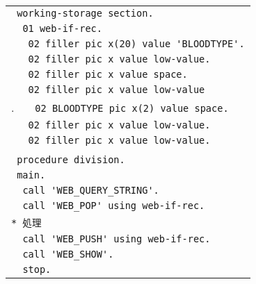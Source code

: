 \begin{itemize}
\begin{tabular}{|l|}
\hline
\verb+ working-storage section.+\\
\verb+  01 web-if-rec.+\\
\verb+   02 filler pic x(20) value 'BLOODTYPE'.+\\
\verb+   02 filler pic x value low-value.+\\
\verb+   02 filler pic x value space.+\\
\verb+   02 filler pic x value low-value+\\.
\verb+   02 BLOODTYPE pic x(2) value space.+\\
\verb+   02 filler pic x value low-value.+\\
\verb+   02 filler pic x value low-value.+\\
\verb++\\
\verb+ procedure division.+\\
\verb+ main.+\\
\verb+  call 'WEB_QUERY_STRING'.+\\
\verb+  call 'WEB_POP' using web-if-rec.+\\
\verb+* 処理+\\
\verb+  call 'WEB_PUSH' using web-if-rec.+\\
\verb+  call 'WEB_SHOW'.+\\
\verb+  stop.+\\
\hline
\end{tabular}

\end{itemize}



